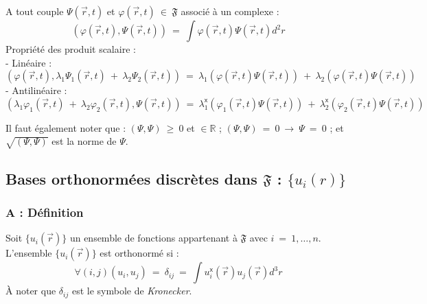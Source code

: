 \documentclass[12pt,a4paper,titlepage]{book}
\begin{document}
A tout couple $\Psi (\overrightarrow{r}, t)$ et $\varphi (\overrightarrow{r}, t) ~\in~ \mathfrak{F}$ associé à un complexe :
\begin{equation*}
(\varphi (\overrightarrow{r}, t), \Psi (\overrightarrow{r}, t)) ~=~ \int \varphi (\overrightarrow{r}, t) \Psi (\overrightarrow{r}, t) d^2 r
\end{equation*}
Propriété des produit scalaire :\\
- Linéaire :
\begin{equation*}
(\varphi (\overrightarrow{r}, t), \lambda_1 \Psi_1 (\overrightarrow{r}, t) ~+~ \lambda_2 \Psi_2 (\overrightarrow{r}, t)) ~=~ \lambda_1 (\varphi (\overrightarrow{r}, t) \Psi (\overrightarrow{r}, t)) ~+~ \lambda_2 (\varphi (\overrightarrow{r}, t) \Psi (\overrightarrow{r}, t))
\end{equation*}
- Antilinéaire :
\begin{equation*}
(\lambda_1 \varphi_1 (\overrightarrow{r}, t) ~+~ \lambda_2 \varphi_2 (\overrightarrow{r}, t), \Psi (\overrightarrow{r}, t)) ~=~ \lambda_1^{\mathsf{x}} (\varphi_1 (\overrightarrow{r}, t) \Psi (\overrightarrow{r}, t)) ~+~ \lambda_2^{\mathsf{x}} (\varphi_2 (\overrightarrow{r}, t) \Psi (\overrightarrow{r}, t))
\end{equation*}

Il faut également noter que : $(\Psi, \Psi) ~\geq~ 0$ et $\in \mathbb{R}$ ; $(\Psi, \Psi) ~=~ 0 ~\rightarrow~ \Psi ~=~ 0$ ; et $\sqrt{(\Psi, \Psi)}$ est la norme de $\Psi$.

\subsection{Bases orthonormées discrètes dans $\mathfrak{F}$ : $\lbrace u_i (r)\rbrace $}
\subsubsection{A : Définition}
Soit $\lbrace u_i (\overrightarrow{r}) \rbrace$ un ensemble de fonctions appartenant à $\mathfrak{F}$ avec $i ~=~ 1, \ldots, n$. L'ensemble $\lbrace u_i (\overrightarrow{r}) \rbrace$ est orthonormé si :\\
\begin{equation*}
\forall (i, j) (u_i, u_j) ~=~ \delta_{ij} ~=~ \int u_i^{\mathsf{x}} (\overrightarrow{r}) u_j (\overrightarrow{r}) d^3 r
\end{equation*}
À noter que $\delta_{ij}$ est le symbole de \textit{Kronecker}.\\
\end{document}
